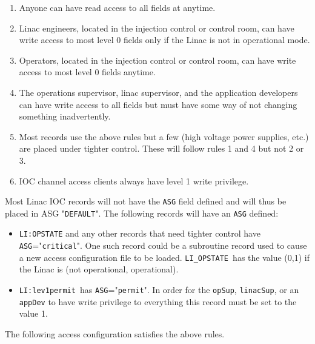 \begin{enumerate}\item Anyone can have read access to all fields at anytime.

\item Linac engineers, located in the injection control or control room, can have write access to most level 0 fields only if 
the Linac is not in operational mode.

\item Operators, located in the injection control or control room, can have write access to most level 0 fields anytime.

\item The operations supervisor, linac supervisor, and the application developers can have write access to all fields but 
must have some way of not changing something inadvertently.

\item Most records use the above rules but a few (high voltage power supplies, etc.) are placed under tighter control. 
These will follow rules 1 and 4 but not 2 or 3.

\item IOC channel access clients always have level 1 write privilege.

\end{enumerate}Most Linac IOC records will not have the \verb|ASG| field defined and will thus be placed in ASG "\verb|DEFAULT|". The following 
records will have an \verb|ASG| defined:

\begin{itemize}\item \verb|LI:OPSTATE| and any other records that need tighter control have \verb|ASG|="\verb|critical|". One such record could be 
a subroutine record used to cause a new access configuration file to be loaded. \verb|LI_OPSTATE |has the value (0,1) 
if the Linac is (not operational, operational).

\item \verb|LI:lev1permit |has \verb|ASG|="\verb|permit|". In order for the \verb|opSup|, \verb|linacSup|, or an \verb|appDev| to have write 
privilege to everything this record must be set to the value 1.

\end{itemize}The following access configuration satisfies the above rules.


